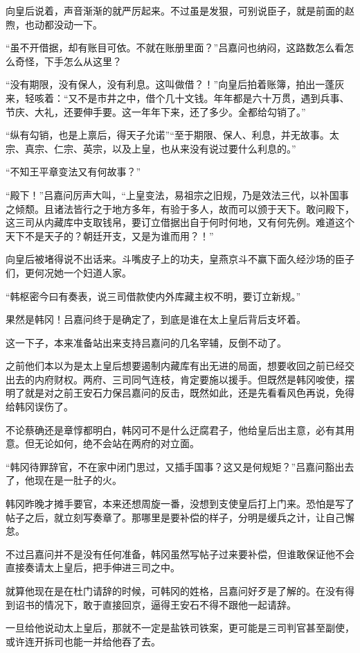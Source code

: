 向皇后说着，声音渐渐的就严厉起来。不过虽是发狠，可别说臣子，就是前面的赵煦，也动都没动一下。

“虽不开借据，却有账目可依。不就在账册里面？”吕嘉问也纳闷，这路数怎么看怎么奇怪，下手怎么从这里？

“没有期限，没有保人，没有利息。这叫做借？！”向皇后拍着账簿，拍出一蓬灰来，轻咳着：“又不是市井之中，借个几十文钱。年年都是六十万贯，遇到兵事、节庆、大礼，还要伸手要。这一年年下来，还了多少。全都给勾销了。”

“纵有勾销，也是上禀后，得天子允诺”“至于期限、保人、利息，并无故事。太宗、真宗、仁宗、英宗，以及上皇，也从来没有说过要什么利息的。”

“不知王平章变法又有何故事？”

“殿下！”吕嘉问厉声大叫，“上皇变法，易祖宗之旧规，乃是效法三代，以补国事之倾颓。且诸法皆行之于地方多年，有验于多人，故而可以颁于天下。敢问殿下，这三司从内藏库中支取钱帛，要订立借据出自于何时何地，又有何先例。难道这个天下不是天子的？朝廷开支，又是为谁而用？！”

向皇后被堵得说不出话来。斗嘴皮子上的功夫，皇燕京斗不赢下面久经沙场的臣子们，更何况她一个妇道人家。

“韩枢密今曰有奏表，说三司借款使内外库藏主权不明，要订立新规。”

果然是韩冈！吕嘉问终于是确定了，到底是谁在太上皇后背后支坏着。

这一下子，本来准备站出来支持吕嘉问的几名宰辅，反倒不动了。

之前他们本以为是太上皇后想要遏制内藏库有出无进的局面，想要收回之前已经交出去的内府财权。两府、三司同气连枝，肯定要施以援手。但既然是韩冈唆使，摆明了就是对之前王安石力保吕嘉问的反击，既然如此，还是先看看风色再说，免得给韩冈误伤了。

不论蔡确还是章惇都明白，韩冈可不是什么迂腐君子，他给皇后出主意，必有其用意。但无论如何，绝不会站在两府的对立面。

“韩冈待罪辞官，不在家中闭门思过，又插手国事？这又是何规矩？”吕嘉问豁出去了，他现在是一肚子的火。

韩冈昨晚才摊手要官，本来还想周旋一番，没想到支使皇后打上门来。恐怕是写了帖子之后，就立刻写奏章了。那哪里是要补偿的样子，分明是缓兵之计，让自己懈怠。

不过吕嘉问并不是没有任何准备，韩冈虽然写帖子过来要补偿，但谁敢保证他不会直接奏请太上皇后，把手伸进三司之中。

就算他现在是在杜门请辞的时候，可韩冈的姓格，吕嘉问好歹是了解的。在没有得到诏书的情况下，敢于直接回京，逼得王安石不得不跟他一起请辞。

一旦给他说动太上皇后，那就不一定是盐铁司铁案，更可能是三司判官甚至副使，或许连开拆司也能一并给他吞了去。

